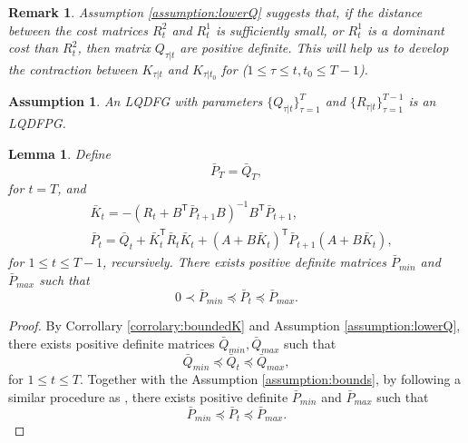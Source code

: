 \documentclass[letterpaper, 10 pt, conference]{ieeeconf}  %
\newcommand{\transpose}{\mathsf{T}}
\newtheorem{lemma}{Lemma}
\newtheorem{assumption}{Assumption}
\newtheorem{remark}{Remark}
\begin{document}
\begin{remark}
    Assumption \ref{assumption:lowerQ} suggests that, if the distance between the cost matrices $R_{t}^{2}$ and $R_{t}^{1}$ is sufficiently small, or $R_{t}^{1}$ is a dominant cost than $R_{t}^{2}$, then matrix $Q_{\tau|t}$ are positive definite. This will help us to develop the contraction between $K_{\tau|t}$ and $K_{\tau|t_{0}}$ for ($1\leq \tau \leq t,t_{0} \leq T-1$).
\end{remark}
\begin{assumption}
    An LQDFG with parameters $\{Q_{\tau|t}\}_{\tau=1}^{T}$ and $\{R_{\tau|t}\}_{\tau=1}^{T-1}$ is an LQDFPG.
\end{assumption}
\begin{lemma}\label{lemma:boundedP}
    Define
    \begin{equation}
        \bar{P}_{T} = \bar{Q}_{T},
    \end{equation}
    for $t = T$, and 
    \begin{equation}
    \begin{split}
        &\bar{K}_{t} = -(R_{t}+ B^{\transpose}\bar{P}_{t+1}B)^{-1}B^{\transpose}\bar{P}_{t+1},\\
        &\bar{P}_{t} = \bar{Q}_{t} + \bar{K}_{t}^{\transpose}\bar{R}_{t}\bar{K}_{t} + (A+B\bar{K}_{t})^{\transpose}\bar{P}_{t+1}(A+B\bar{K}_{t}),
    \end{split}
    \end{equation}
    for $1\leq t \leq T-1$, recursively. There exists positive definite matrices $\bar{P}_{min}$ and $\bar{P}_{max}$ such that
    \begin{equation}
        0 \prec \bar{P}_{min} \preceq \bar{P}_{t} \preceq \bar{P}_{max}.
    \end{equation}
\end{lemma}
\begin{proof}
    By Corrollary \ref{corrolary:boundedK} and Assumption \ref{assumption:lowerQ}, there exists positive definite matrices $\bar{Q}_{min},\bar{Q}_{max}$ such that
    \begin{equation}
        \bar{Q}_{min} \preceq \bar{Q}_{t} \preceq \bar{Q}_{max},
    \end{equation}
    for $1\leq t \leq T$.
    Together with the Assumption \ref{assumption:bounds}, by following a similar procedure as \cite[Proposition 11.]{zhang_regret_2021}, there exists positive definite $\bar{P}_{min}$ and $\bar{P}_{max}$ such that
    \begin{equation*}
        \bar{P}_{min} \preceq \bar{P}_{t} \preceq \bar{P}_{max}.
    \end{equation*}
\end{proof}
\end{document}
